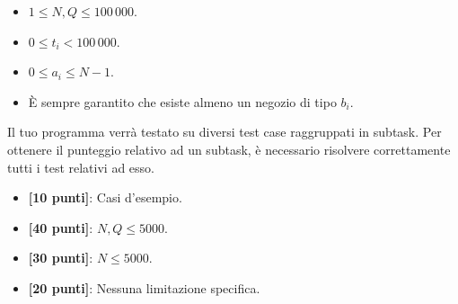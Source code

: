 \Constraints
\begin{itemize}[nolistsep, itemsep=2mm]
    \item $1 \le N, Q \le 100\,000$.
    \item $0 \le t_i < 100\,000$.
    \item $0 \le a_i \le N-1$.
    \item È sempre garantito che esiste almeno un negozio di tipo $b_i$.
\end{itemize}

\Scoring
Il tuo programma verrà testato su diversi test case raggruppati in subtask.
Per ottenere il punteggio relativo ad un subtask, è necessario risolvere
correttamente tutti i test relativi ad esso.

\begin{itemize}[nolistsep,itemsep=2mm]
  \item \textbf{ [10 punti]}: Casi d'esempio.
  \item \textbf{ [40 punti]}: $N, Q \le 5000$.
  \item \textbf{ [30 punti]}: $N \le 5000$.
  \item \textbf{ [20 punti]}: Nessuna limitazione specifica.
\end{itemize}



\Examples
\begin{example}
%
%
%
\end{example}
